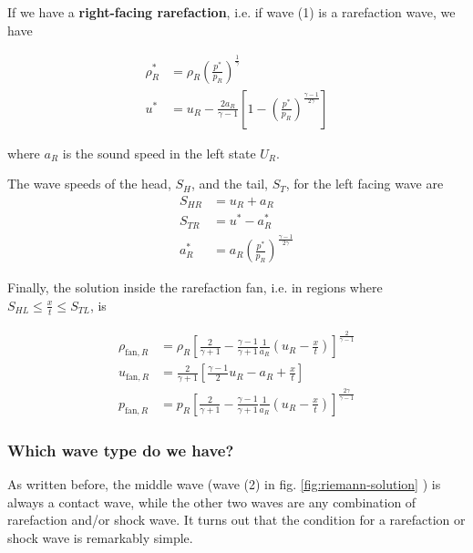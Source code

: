 If we have a \textbf{right-facing rarefaction}, i.e. if wave (1) is a rarefaction wave, we have

\begin{align*}
	\rho^*_R &= 
		\rho_R \left( \frac{p^*}{p_R} \right) ^ \frac{1}{\gamma}\\
	u^* &= 
		u_R - \frac{2 a_R}{\gamma - 1} \left[ 1 - \left( \frac{p^*}{p_R} \right) ^ \frac{\gamma - 1}{2 \gamma}  \right]  
\end{align*}

where $a_R$ is the sound speed in the left state $U_R$.





The wave speeds of the head, $S_H$, and the tail, $S_T$, for the left facing wave are
\begin{align*}
	S_{HR} &= u_R + a_R\\
	S_{TR} &= u^* - a^*_R\\
	a^*_R  &= a_R \left( \frac{p^*}{p_R} \right) ^ \frac{\gamma - 1}{2 \gamma}
\end{align*}




Finally, the solution inside the rarefaction fan, i.e. in regions where $S_{HL} \leq \frac{x}{t} \leq S_{TL}$, is 

\begin{align*}
	\rho_{\text{fan}, R} &= 
		\rho_R \left[ \frac{2}{\gamma + 1} - \frac{\gamma - 1}{\gamma + 1} \frac{1}{a_R} \left(u_R - \frac{x}{t}\right) \right] ^ \frac{2}{\gamma -1 }\\
	u_{\text{fan}, R} &= 
		\frac{2}{\gamma + 1} \left[ \frac{\gamma - 1}{2} u_R - a_R + \frac{x}{t}  \right] \\
	p_{\text{fan}, R} &= 
		p_R \left[ \frac{2}{\gamma + 1} - \frac{\gamma - 1}{\gamma + 1} \frac{1}{a_R} \left(u_R - \frac{x}{t}\right) \right] ^ \frac{2 \gamma}{\gamma -1}
\end{align*}












\subsubsection{Which wave type do we have?}


As written before, the middle wave (wave (2) in fig. \ref{fig:riemann-solution} ) is always a contact wave, while the other two waves are any combination of rarefaction and/or shock wave.
It turns out that the condition for a rarefaction or shock wave is remarkably simple.

